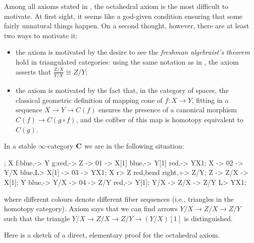 \begin{example}
Among all axioms stated in \adef {}, the octahedral axiom  is the most difficult to motivate. At first sight, it seems like a god\hyp{}given condition ensuring that some fairly unnatural things happen. On a second thought, however, there are at least two ways to motivate it:
\begin{itemize}
\item the axiom is motivated by the desire to see the \emph{freshman algebraist's theorem} hold in triangulated categories: using the same notation as in , the axiom asserts that $\frac{Z/X}{Y/X}\cong Z/Y$;
\item the axiom is motivated by the fact that, in the category of spaces, the classical geometric definition of mapping cone of $f\colon X\to Y$, fitting in a sequence $X\to Y\to C(f)$ ensures the presence of a canonical morphism $C(f)\to C(g\circ f)$, and the cofiber of this map is homotopy equivalent to $C(g)$.
\end{itemize}
In a stable $\infty$\hyp{}category $\mathbf{C}$ we are in the following situation:
\begin{center}
\begin{kD}
;
\mor X f:blue,-> Y g:red,-> Z -> 01 -> X[1] blue,-> Y[1] red,-> YX1;
\mor X -> 02 -> Y/X blue,L> X[1] -> 03 -> YX1;
\mor X r> Z red,{bend right},÷> Z/Y; \mor Z -> Z/X -> X[1];
\mor Y blue,-> Y/X -> 04 -> Z/Y red,-> Y[1];
\mor[dashed] Y/X -> Z/X -> Z/Y L> YX1;
\end{kD}
\end{center}
where different colours denote different fiber sequences (i.e., triangles in the homotopy category). Axiom  says that we can find arrows $Y/X\to Z/X\to Z/Y$  such that the triangle $Y/X\to Z/X\to Z/Y\to (Y/X)[1]$ is distinguished.

Here is a sketch of a direct, elementary proof for the octahedral axiom.


\end{example}
